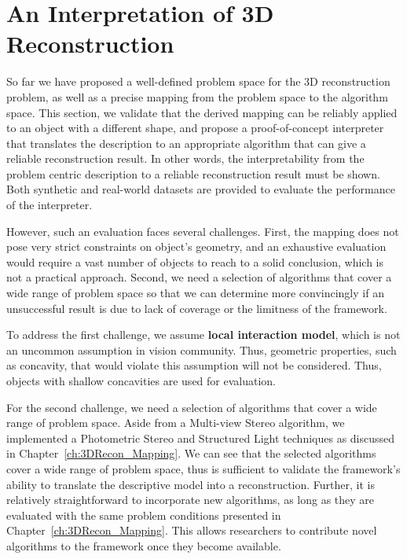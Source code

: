 
\chapter{An Interpretation of 3D Reconstruction}
\label{ch:3DRecon_Interp}
So far we have proposed a well-defined problem space for the 3D reconstruction problem, as well as a precise mapping from the problem space to the algorithm space. This section, we validate that the derived mapping can be reliably applied to an object with a different shape, and propose a proof-of-concept interpreter that translates the description to an appropriate algorithm that can give a reliable reconstruction result. In other words, the interpretability from the problem centric description to a reliable reconstruction result must be shown. Both synthetic and real-world datasets are provided to evaluate the performance of the interpreter.

However, such an evaluation faces several challenges. First, the mapping does not pose very strict constraints on object's geometry, and an exhaustive evaluation would require a vast number of objects to reach to a solid conclusion, which is not a practical approach. Second, we need a selection of algorithms that cover a wide range of problem space so that we can determine more convincingly if an unsuccessful result is due to lack of coverage or the limitness of the framework.

To address the first challenge, we assume \textbf{local interaction model}, which is not an uncommon assumption in vision community. Thus, geometric properties, such as concavity, that would violate this assumption will not be considered. Thus, objects with shallow concavities are used for evaluation.

For the second challenge, we need a selection of algorithms that cover a wide range of problem space. Aside from a Multi-view Stereo algorithm, we implemented a Photometric Stereo and Structured Light techniques as discussed in Chapter~\ref{ch:3DRecon_Mapping}. We can see that the selected algorithms cover a wide range of problem space, thus is sufficient to validate the framework's ability to translate the descriptive model into a reconstruction. Further, it is relatively straightforward to incorporate new algorithms, as long as they are evaluated with the same problem conditions presented in Chapter~\ref{ch:3DRecon_Mapping}. This allows researchers to contribute novel algorithms to the framework once they become available.


